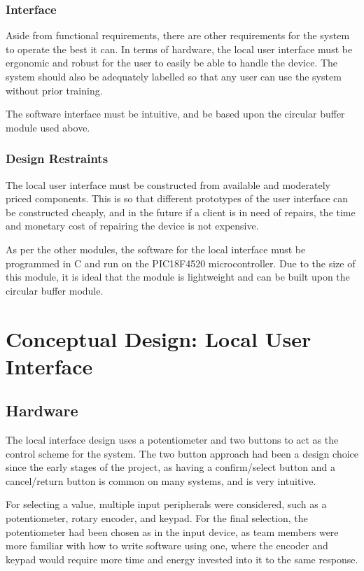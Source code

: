 \documentclass[]{report}
\begin{document}
\subsubsection{Interface}
Aside from functional requirements, there are other requirements for the system to operate the best it can. In terms of hardware, the local user interface must be ergonomic and robust for the user to easily be able to handle the device. The system should also be adequately labelled so that any user can use the system without prior training.

The software interface must be intuitive, and be based upon the circular buffer module used above.
\subsubsection{Design Restraints}
The local user interface must be constructed from available and moderately priced components. This is so that different prototypes of the user interface can be constructed cheaply, and in the future if a client is in need of repairs, the time and monetary cost of repairing the device is not expensive.

As per the other modules, the software for the local interface must be programmed in C and run on the PIC18F4520 microcontroller. Due to the size of this module, it is ideal that the module is lightweight and can be built upon the circular buffer module.

\section{Conceptual Design: Local User Interface}
\subsection{Hardware}
The local interface design uses a potentiometer and two buttons to  act as the control scheme for the system. The two button approach had been a design choice since the early stages of the project, as having a confirm/select button and a cancel/return button is common on many systems, and is very intuitive. 

For selecting a value, multiple input peripherals were considered, such as a potentiometer, rotary encoder, and keypad. For the final selection, the potentiometer had been chosen as in the input device, as team members were more familiar with how to write software using one, where the encoder and keypad would require more time and energy invested into it to the same response. 
\end{document}
